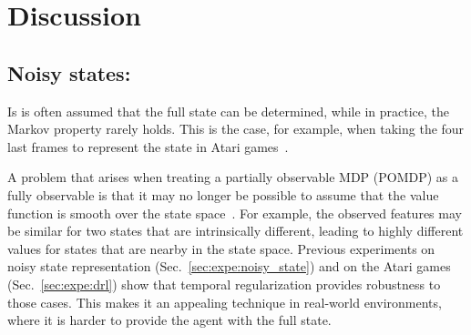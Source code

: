 \section{Discussion}

\subsection{Noisy states:}

Is is often assumed that the full state can be determined, while in practice, the Markov property rarely holds. This is the case, for example, when taking the four last frames to represent the state in Atari games~\cite{mnih2015human}. 

A problem that arises when treating a partially observable MDP (POMDP) as a fully observable is that it may no longer be possible to assume that the value function is smooth over the state space~\cite{singh1994learning}.
For example, the observed features may be similar for two states that are intrinsically different, leading to highly different values for states that are nearby in the state space. Previous experiments on noisy state representation (Sec.~\ref{sec:expe:noisy_state}) and on the Atari games (Sec.~\ref{sec:expe:drl}) show that temporal regularization provides robustness to those cases. This makes it an appealing technique in real-world environments, where it is harder to provide the agent with the full state.
